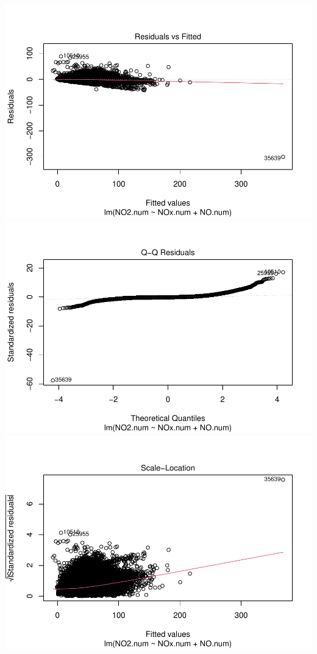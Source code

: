 \documentclass[notspecified,article,submit,moreauthors,pdftex]{Definitions/mdpi}
\begin{document}
\includegraphics{ProyectoAED2023_files/figure-latex/unnamed-chunk-14-1.pdf}
\includegraphics{ProyectoAED2023_files/figure-latex/unnamed-chunk-14-2.pdf}
\includegraphics{ProyectoAED2023_files/figure-latex/unnamed-chunk-14-3.pdf}
\end{document}
